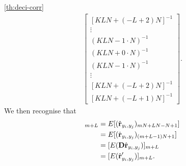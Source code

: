\documentclass[a4paper, openany, oneside]{memoir}
\begin{document}
\begin{blockProofTheorem}{\ref{th:deci-corr}}
\begin{align*}
\begin{bmatrix}
            [KLN+(-L+2)N]^{-1} \\
            \vdots \\
            (KLN -1 \cdot N)^{-1} \\
            (KLN+ 0 \cdot N)^{-1} \\
            (KLN -1 \cdot N)^{-1} \\
            \vdots \\
            [KLN+(-L+2)N]^{-1} \\
            [KLN+(-L+1)N]^{-1}
         \end{bmatrix}.
    \end{align*}
    We then recognise that
    \begin{align*}
        [E(\vec{w} \odot N\hat{\vec{r}}_{y'_i,y'_j})]_{m+L} &= E[(\hat{\vec{r}}_{y_i,y_j})_{mN+LN-N+1}] \\
        &= E[(\hat{\vec{r}}_{y_i,y_j})_{(m+L-1)N+1}] \\
        &= [E(\mat{D} \hat{\vec{r}}_{y_i,y_j})]_{m+L} \\
        &= [E(\hat{\vec{r}}'_{y_i,y_j})]_{m+L}.
    \end{align*}
\end{blockProofTheorem}
\end{document}
